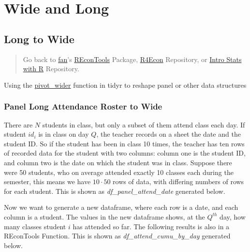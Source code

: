 \documentclass[
]{book}
\begin{document}
\hypertarget{wide-and-long}{%
\section{Wide and Long}\label{wide-and-long}}

\hypertarget{long-to-wide}{%
\subsection{Long to Wide}\label{long-to-wide}}

\begin{quote}
Go back to \href{http://fanwangecon.github.io/CodeDynaAsset/}{fan}'s \href{https://fanwangecon.github.io/REconTools/}{REconTools} Package, \href{https://fanwangecon.github.io/R4Econ/}{R4Econ} Repository, or \href{https://fanwangecon.github.io/Stat4Econ/}{Intro Stats with R} Repository.
\end{quote}

Using the \href{https://tidyr.tidyverse.org/reference/pivot_wider.html}{pivot\_wider} function in tidyr to reshape panel or other data structures

\hypertarget{panel-long-attendance-roster-to-wide}{%
\subsubsection{Panel Long Attendance Roster to Wide}\label{panel-long-attendance-roster-to-wide}}

There are \(N\) students in class, but only a subset of them attend class each day. If student \(id_i\) is in class on day \(Q\), the teacher records on a sheet the date and the student ID. So if the student has been in class 10 times, the teacher has ten rows of recorded data for the student with two columns: column one is the student ID, and column two is the date on which the student was in class. Suppose there were 50 students, who on average attended exactly 10 classes each during the semester, this means we have \(10 \cdot 50\) rows of data, with differing numbers of rows for each student. This is shown as \emph{df\_panel\_attend\_date} generated below.

Now we want to generate a new dataframe, where each row is a date, and each column is a student. The values in the new dataframe shows, at the \(Q^{th}\) day, how many classes student \(i\) has attended so far. The following results is also in a REconTools Function. This is shown as \emph{df\_attend\_cumu\_by\_day} generated below.
\end{document}
